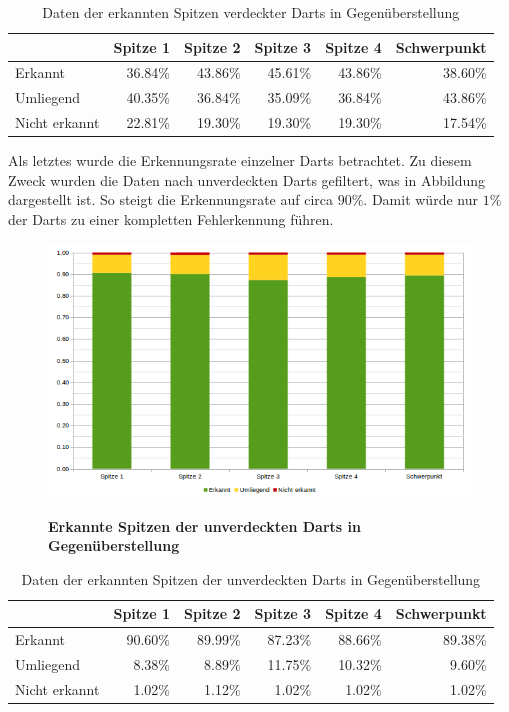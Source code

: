\begin{table}[htbp]
\caption{Daten der erkannten Spitzen verdeckter Darts in Gegenüberstellung}
\begin{tabular}{|l|r|r|r|r|r|}
\hline
 & \multicolumn{1}{l|}{Spitze 1} & \multicolumn{1}{l|}{Spitze 2} & \multicolumn{1}{l|}{Spitze 3} & \multicolumn{1}{l|}{Spitze 4} & \multicolumn{1}{l|}{Schwerpunkt} \\ \hline
Erkannt & 36.84\% & 43.86\% & 45.61\% & 43.86\% & 38.60\% \\ \hline
Umliegend & 40.35\% & 36.84\% & 35.09\% & 36.84\% & 43.86\% \\ \hline
Nicht erkannt & 22.81\% & 19.30\% & 19.30\% & 19.30\% & 17.54\% \\ \hline
\end{tabular}
\label{}
\end{table}


Als letztes wurde die Erkennungsrate einzelner Darts betrachtet. Zu diesem Zweck wurden die Daten nach unverdeckten Darts gefiltert, was in Abbildung  dargestellt ist. So steigt die Erkennungsrate auf circa $90\%$. Damit würde nur $1\%$ der Darts zu einer kompletten Fehlerkennung führen. 

\begin{figure}[ht]
\centering
\includegraphics[width=\textwidth]{media/chartwithoutcovert}\\
\caption{\textbf{Erkannte Spitzen der unverdeckten Darts in Gegenüberstellung}}
\label{Fig:chartuncovert}
\end{figure}

\begin{table}[ht]
\caption{Daten der erkannten Spitzen der unverdeckten Darts in Gegenüberstellung}
\begin{tabular}{|l|r|r|r|r|r|}
\hline
 & \multicolumn{1}{l|}{Spitze 1} & \multicolumn{1}{l|}{Spitze 2} & \multicolumn{1}{l|}{Spitze 3} & \multicolumn{1}{l|}{Spitze 4} & \multicolumn{1}{l|}{Schwerpunkt} \\ \hline
Erkannt & 90.60\% & 89.99\% & 87.23\% & 88.66\% & 89.38\% \\ \hline
Umliegend & 8.38\% & 8.89\% & 11.75\% & 10.32\% & 9.60\% \\ \hline
Nicht erkannt & 1.02\% & 1.12\% & 1.02\% & 1.02\% & 1.02\% \\ \hline
\end{tabular}
\label{}
\end{table}



